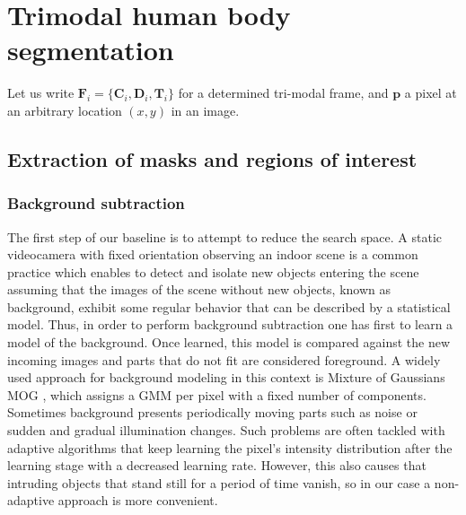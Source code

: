 \documentclass[10pt,twocolumn,letterpaper]{article}
\begin{document}
\section{Trimodal human body segmentation}
\label{sec:trimodalhumanbodysegmentation}

Let us write $\mathbf{F}_i = \{\mathbf{C}_i, \mathbf{D}_i, \mathbf{T}_i\}$ for a determined tri-modal frame, and $\mathbf{p}$ a pixel at an arbitrary location $(x,y)$ in an image.

\subsection{Extraction of masks and regions of interest} 
\label{ssec:bsbb}


\subsubsection{Background subtraction}\label{sect:bs}
The first step of our baseline is to attempt to reduce the search space. A static videocamera with fixed orientation observing an indoor scene is a common practice which enables to detect and isolate new objects entering the scene assuming that the images of the scene without new objects, known as background, exhibit some regular behavior that can be described by a statistical model. Thus, in order to perform background subtraction one has first to learn a model of the background. Once learned, this model is compared against the new incoming images and parts that do not fit are considered foreground. A widely used approach for background modeling in this context is Mixture of Gaussians MOG  \cite{bouwmans2008background}, which assigns a GMM per pixel with a fixed number of components. Sometimes background presents periodically moving parts such as noise or sudden and gradual illumination changes. Such problems are often tackled with adaptive algorithms that keep learning the pixel's intensity distribution after the learning stage with a decreased learning rate. However, this also causes that intruding objects that stand still for a period of time vanish, so in our case a non-adaptive approach is more convenient.
\end{document}
